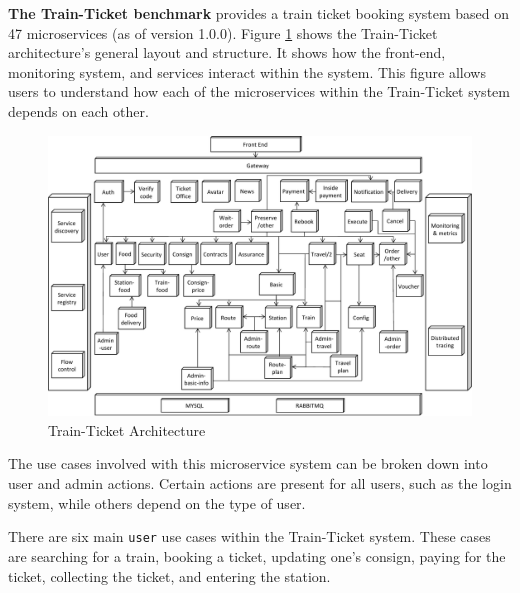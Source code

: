 
{\bf The Train-Ticket benchmark} provides a train ticket booking system based on 47 microservices (as of version 1.0.0). Figure \ref{fig:train} shows the Train-Ticket architecture's general layout and structure. It shows how the front-end, monitoring system, and services interact within the system. This figure allows users to understand how each of the microservices within the Train-Ticket system depends on each other.


\begin{figure}[h]
    \centering
    \hspace{-1.3em}
    \includegraphics[width=1.02\columnwidth]{img/trainticket-our.pdf}
       \caption{Train-Ticket Architecture \cite{trainticket}}
       \label{fig:train}
\end{figure}

The use cases involved with this microservice system can be broken down into user and admin actions. Certain actions are present for all users, such as the login system, while others depend on the type of user. 

There are six main \texttt{user} use cases within the Train-Ticket system. These cases are searching for a train, booking a ticket, updating one's consign, paying for the ticket, collecting the ticket, and entering the station. 

